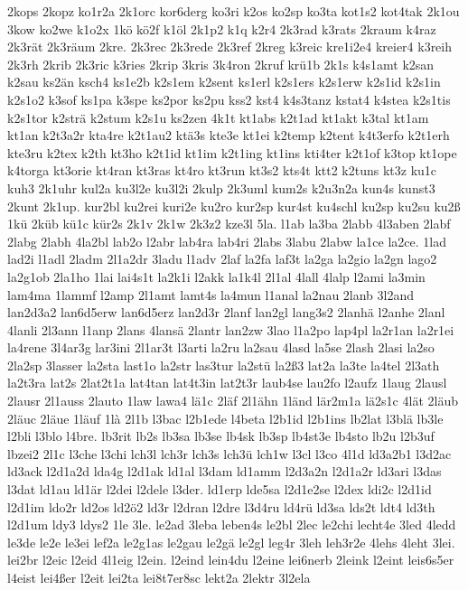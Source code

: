 {2kops
2kopz
ko1r2a
2k1orc
kor6derg
ko3ri
k2os
ko2sp
ko3ta
kot1s2
kot4tak
2k1ou
3kow
ko2we
k1o2x
1kö
kö2f
k1öl
2k1p2
k1q
k2r4
2k3rad
k3rats
2kraum
k4raz
2k3rät
2k3räum
2kre.
2k3rec
2k3rede
2k3ref
2kreg
k3reic
kre1i2e4
kreier4
k3reih
2k3rh
2krib
2k3ric
k3ries
2krip
3kris
3k4ron
2kruf
krü1b
2k1s
k4s1amt
k2san
k2sau
ks2än
ksch4
ks1e2b
k2s1em
k2sent
ks1erl
k2s1ers
k2s1erw
k2s1id
k2s1in
k2s1o2
k3sof
ks1pa
k3spe
ks2por
ks2pu
kss2
kst4
k4s3tanz
kstat4
k4stea
k2s1tis
k2s1tor
k2strä
k2stum
k2s1u
ks2zen
4k1t
kt1abs
k2t1ad
kt1akt
k3tal
kt1am
kt1an
k2t3a2r
kta4re
k2t1au2
ktä3s
kte3e
kt1ei
k2temp
k2tent
k4t3erfo
k2t1erh
kte3ru
k2tex
k2th
kt3ho
k2t1id
kt1im
k2t1ing
kt1ins
kti4ter
k2t1of
k3top
kt1ope
k4torga
kt3orie
kt4ran
kt3ras
kt4ro
kt3run
kt3s2
kts4t
ktt2
k2tuns
kt3z
ku1c
kuh3
2k1uhr
kul2a
ku3l2e
ku3l2i
2kulp
2k3uml
kum2s
k2u3n2a
kun4s
kunst3
2kunt
2k1up.
kur2bl
ku2rei
kuri2e
ku2ro
kur2sp
kur4st
ku4schl
ku2sp
ku2su
ku2ß
1kü
2küb
kü1c
kür2s
2k1v
2k1w
2k3z2
kze3l
5la.
l1ab
la3ba
2labb
4l3aben
2labf
2labg
2labh
4la2bl
lab2o
l2abr
lab4ra
lab4ri
2labs
3labu
2labw
la1ce
la2ce.
1lad
lad2i
l1adl
2ladm
2l1a2dr
3ladu
l1adv
2laf
la2fa
laf3t
la2ga
la2gio
la2gn
lago2
la2g1ob
2la1ho
1lai
lai4s1t
la2k1i
l2akk
la1k4l
2l1al
4lall
4lalp
l2ami
la3min
lam4ma
1lammf
l2amp
2l1amt
lamt4s
la4mun
l1anal
la2nau
2lanb
3l2and
lan2d3a2
lan6d5erw
lan6d5erz
lan2d3r
2lanf
lan2gl
lang3s2
2lanhä
l2anhe
2lanl
4lanli
2l3ann
l1anp
2lans
4lansä
2lantr
lan2zw
3lao
l1a2po
lap4pl
la2r1an
la2r1ei
la4rene
3l4ar3g
lar3ini
2l1ar3t
l3arti
la2ru
la2sau
4lasd
la5se
2lash
2lasi
la2so
2la2sp
3lasser
la2sta
last1o
la2str
las3tur
la2stü
la2ß3
lat2a
la3te
la4tel
2l3ath
la2t3ra
lat2s
2lat2t1a
lat4tan
lat4t3in
lat2t3r
laub4se
lau2fo
l2aufz
1laug
2lausl
2lausr
2l1auss
2lauto
1law
lawa4
lä1c
2läf
2l1ähn
1länd
lär2m1a
lä2s1c
4lät
2läub
2läuc
2läue
1läuf
1là
2l1b
l3bac
l2b1ede
l4beta
l2b1id
l2b1ins
lb2lat
l3blä
lb3le
l2bli
l3blo
l4bre.
lb3rit
lb2s
lb3sa
lb3se
lb4sk
lb3sp
lb4st3e
lb4sto
lb2u
l2b3uf
lbzei2
2l1c
l3che
l3chi
lch3l
lch3r
lch3s
lch3ü
lch1w
l3cl
l3co
4l1d
ld3a2b1
l3d2ac
ld3ack
l2d1a2d
lda4g
l2d1ak
ld1al
l3dam
ld1amm
l2d3a2n
l2d1a2r
ld3ari
l3das
l3dat
ld1au
ld1är
l2dei
l2dele
l3der.
ld1erp
lde5sa
l2d1e2se
l2dex
ldi2c
l2d1id
l2d1im
ldo2r
ld2os
ld2ö2
ld3r
l2dran
l2dre
l3d4ru
ld4rü
ld3sa
lds2t
ldt4
ld3th
l2d1um
ldy3
ldys2
1le
3le.
le2ad
3leba
leben4s
le2bl
2lec
le2chi
lecht4e
3led
4ledd
le3de
le2e
le3ei
lef2a
le2g1as
le2gau
le2gä
le2gl
leg4r
3leh
leh3r2e
4lehs
4leht
3lei.
lei2br
l2eic
l2eid
4l1eig
l2ein.
l2eind
lein4du
l2eine
lei6nerb
2leink
l2eint
leis6s5er
l4eist
lei4ßer
l2eit
lei2ta
lei8t7er8sc
lekt2a
2lektr
3l2ela
}

